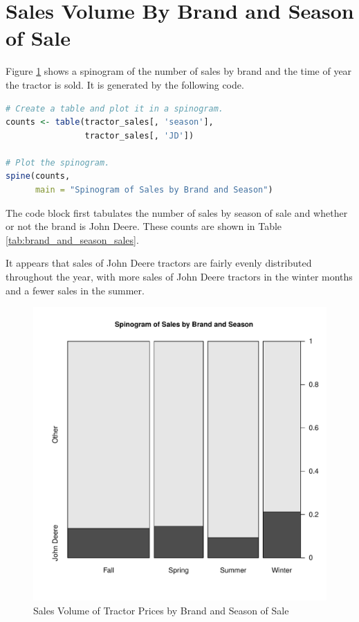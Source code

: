 \pagebreak
\section{Sales Volume By Brand and Season of Sale}

Figure \ref{fig:brand_and_season_sales}
shows a spinogram of the number of sales
by brand and the time of year the tractor is sold.
It is generated by the following code.

\begin{lstlisting}[language=R]
# Create a table and plot it in a spinogram.
counts <- table(tractor_sales[, 'season'],
                tractor_sales[, 'JD'])

# Plot the spinogram.
spine(counts,
      main = "Spinogram of Sales by Brand and Season")
\end{lstlisting}

The code block first tabulates the number of sales by
season of sale and whether or not the brand is John Deere.
These counts are shown in Table \ref{tab:brand_and_season_sales}.



\pagebreak
It appears that sales of John Deere tractors are fairly evenly
distributed throughout the year,
with more sales of John Deere tractors in the winter months
and a fewer sales in the summer.


\begin{figure}[h!]
  \centering
  \includegraphics[scale = 0.5, keepaspectratio=true]{../Figures/brand_and_season_sales}
  \caption{Sales Volume of Tractor Prices by Brand and Season of Sale} \label{fig:brand_and_season_sales}
\end{figure}




